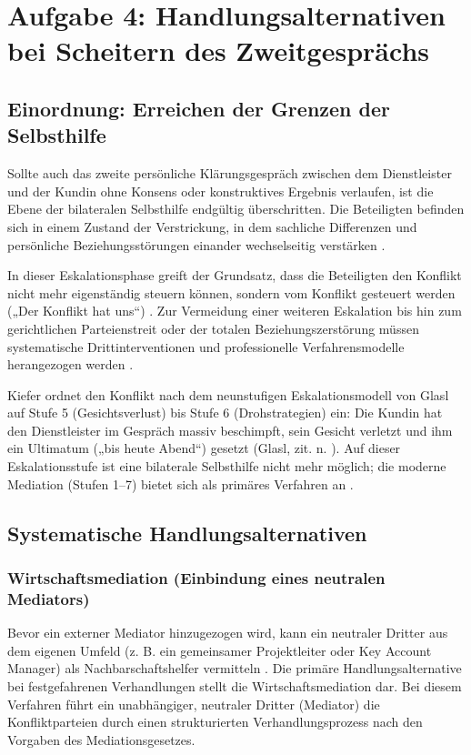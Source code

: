 
\chapter{Aufgabe 4: Handlungsalternativen bei Scheitern des Zweitgesprächs} 
\label{sec:aufgabe4}

\section{Einordnung: Erreichen der Grenzen der Selbsthilfe}
Sollte auch das zweite persönliche Klärungsgespräch zwischen dem Dienstleister und der Kundin ohne Konsens oder konstruktives Ergebnis verlaufen, ist die Ebene der bilateralen Selbsthilfe endgültig überschritten. Die Beteiligten befinden sich in einem Zustand der Verstrickung, in dem sachliche Differenzen und persönliche Beziehungsstörungen einander wechselseitig verstärken \cite[S.~42--43]{5}. 

In dieser Eskalationsphase greift der Grundsatz, dass die Beteiligten den Konflikt nicht mehr eigenständig steuern können, sondern vom Konflikt gesteuert werden („Der Konflikt hat uns“) \cite[S.~42]{5}. Zur Vermeidung einer weiteren Eskalation bis hin zum gerichtlichen Parteienstreit oder der totalen Beziehungszerstörung müssen systematische Drittinterventionen und professionelle Verfahrensmodelle herangezogen werden \cite[S.~56]{5}.

Kiefer ordnet den Konflikt nach dem neunstufigen Eskalationsmodell von Glasl auf Stufe 5 (Gesichtsverlust) bis Stufe 6 (Drohstrategien) ein: Die Kundin hat den Dienstleister im Gespräch massiv beschimpft, sein Gesicht verletzt und ihm ein Ultimatum („bis heute Abend“) gesetzt (Glasl, zit. n. \cite[S.~34--38]{5}). Auf dieser Eskalationsstufe ist eine bilaterale Selbsthilfe nicht mehr möglich; die moderne Mediation (Stufen 1–7) bietet sich als primäres Verfahren an \cite[S.~70--72]{5}.

\section{Systematische Handlungsalternativen}

\subsection{Wirtschaftsmediation (Einbindung eines neutralen Mediators)}
Bevor ein externer Mediator hinzugezogen wird, kann ein neutraler Dritter aus dem eigenen Umfeld (z. B. ein gemeinsamer Projektleiter oder Key Account Manager) als Nachbarschaftshelfer vermitteln \cite[S.~53--54]{5}.
Die primäre Handlungsalternative bei festgefahrenen Verhandlungen stellt die Wirtschaftsmediation dar. Bei diesem Verfahren führt ein unabhängiger, neutraler Dritter (Mediator) die Konfliktparteien durch einen strukturierten Verhandlungsprozess nach den Vorgaben des Mediationsgesetzes.

